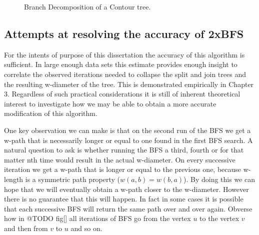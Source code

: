 \begin{figure}
    \qquad
    \caption{Branch Decomposition of a Contour tree.}%
    \label{fig:path-cases}%
\end{figure}



\subsection{Attempts at resolving the accuracy of 2xBFS}



For the intents of purpose of this dissertation the accuracy of this algorithm is sufficient. In large enough data sets this estimate provides enough insight to correlate the observed iterations needed to collapse the split and join trees and the resulting w-diameter of the tree. This is demonstrated empirically in Chapter 3. Regardless of such practical considerations it is still of inherent theoretical interest to investigate how we may be able to obtain a more accurate modification of this algorithm.

One key observation we can make is that on the second run of the BFS we get a w-path that is necessarily longer or equal to one found in the first BFS search. A natural question to ask is whether running the BFS a third, fourth or for that matter nth time would result in the actual w-diameter. On every successive iteration we get a w-path that is longer or equal to the previous one, because w-length is a symmetric path property ($w(a, b) = w(b, a)$). By doing this we can hope that we will eventually obtain a w-path closer to the w-diameter. However there is no guarantee that this will happen. In fact in some cases it is possible that each successive BFS will return the same path over and over again. Obverse how in @TODO fig[] all iterations of BFS go from the vertex $u$ to the vertex $v$ and then from $v$ to $u$ and so on. 


